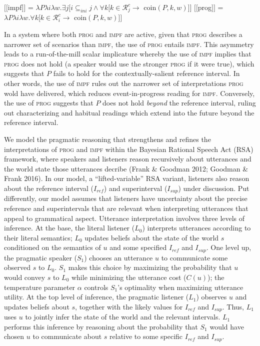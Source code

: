 \documentclass[12pt]{article}
\newcommand{\sem}[1]{\mbox{$[\![$#1$]\!]$}}
\begin{document}
\vspace{-8pt}
\begin{exe}
\ex\label{semantics}\begin{xlist}
\ex \sem{\sc impf} = $\lambda P\lambda i\lambda w.\exists j[i \subseteq_{ini} j \wedge \forall k[k \in \mathscr{R}_j^c \to$ {\sc coin}$(P,k,w)]]$
\ex \sem{\sc prog} = $\lambda P\lambda i\lambda w.\forall k[k \in \mathscr{R}_i^c \to$ {\sc coin}$(P,k,w)]]$
\end{xlist}
\end{exe}
\vspace{-8pt}
In a system where both \textsc{prog} and \textsc{impf} are active, given that \textsc{prog} describes a narrower set of scenarios than \textsc{impf}, the use of \textsc{prog} entails \textsc{impf}. This asymmetry leads to a run-of-the-mill scalar implicature whereby the use of \textsc{impf} implies that \textsc{prog} does not hold (a speaker would use the stronger \textsc{prog} if it were true), which suggests that $P$ fails to hold for the contextually-salient reference interval. In other words, the use of \textsc{impf} rules out the narrower set of interpretations \textsc{prog} wold have delivered, which reduces event-in-progress reading for \textsc{impf}. Conversely, the use of %
\textsc{prog} suggests that $P$ does not hold \textit{beyond} the reference interval, ruling out characterizing and habitual readings which extend into the future beyond the reference interval.

We model the pragmatic reasoning that strengthens and refines the interpretations of \textsc{prog} and \textsc{impf} within the Bayesian Rational Speech Act (RSA) framework, where speakers and listeners reason recursively about utterances and the world state those utterances decribe (Frank \& Goodman 2012; Goodman \& Frank 2016). In our model, a ``lifted-variable'' RSA variant, listeners also reason about the reference interval ($I_{ref}$) and superinterval ($I_{sup}$) under discussion. Put differently, our model assumes that listeners have uncertainty about the precise reference and superintervals that are relevant when interpreting utterances that appeal to grammatical aspect. Utterance interpretation involves three levels of inference. At the base, the literal listener ($L_0$) interprets utterances according to their literal semantics; $L_0$ updates beliefs about the state of the world $s$ conditioned on the semantics of $u$ and some specified $I_{ref}$ and $I_{sup}$. One level up, the pragmatic speaker ($S_1$) chooses an utterance $u$ to communicate some observed $s$ to $L_0$. $S_1$ makes this choice by maximizing the probability that $u$ would convey $s$ to $L_0$ while minimizing the utterance cost ($C(u)$); the temperature parameter $\alpha$ controls $S_1$'s optimality when maximizing utterance utility. At the top level of inference, the pragmatic listener ($L_1$) observes $u$ and updates beliefs about $s$, together with the likely values for $I_{ref}$ and $I_{sup}$. Thus, $L_1$ uses $u$ to jointly infer the state of the world and the relevant intervals. $L_1$ performs this inference by reasoning about the probability that  $S_1$ would have chosen $u$ to communicate about $s$ relative to some specific $I_{ref}$ and $I_{sup}$.
\end{document}
